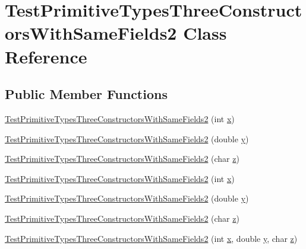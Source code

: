 \hypertarget{classTestPrimitiveTypesThreeConstructorsWithSameFields2}{
\section{TestPrimitiveTypesThreeConstructorsWithSameFields2 Class Reference}
\label{classTestPrimitiveTypesThreeConstructorsWithSameFields2}
}
\subsection*{Public Member Functions}
\begin{DoxyCompactItemize}
\item 
\hyperlink{classTestPrimitiveTypesThreeConstructorsWithSameFields2_a21de4d72a427b8ff8c87daaf504a3c83}{TestPrimitiveTypesThreeConstructorsWithSameFields2} (int \hyperlink{classTestPrimitiveTypesThreeConstructorsWithSameFields2_a12541d3220601d6ee9aad996a9c0f80d}{x})
\item 
\hyperlink{classTestPrimitiveTypesThreeConstructorsWithSameFields2_a541ff10a2f77e0180abb933d0289ac44}{TestPrimitiveTypesThreeConstructorsWithSameFields2} (double \hyperlink{classTestPrimitiveTypesThreeConstructorsWithSameFields2_abdd1cc774447a96460c59d9a208e8b67}{y})
\item 
\hyperlink{classTestPrimitiveTypesThreeConstructorsWithSameFields2_a09e291c22e0e9e5d6fd5bd92dacfb1f7}{TestPrimitiveTypesThreeConstructorsWithSameFields2} (char \hyperlink{classTestPrimitiveTypesThreeConstructorsWithSameFields2_afb46476d95f1cb84e71b6d991e3c916a}{z})
\item 
\hyperlink{classTestPrimitiveTypesThreeConstructorsWithSameFields2_a21de4d72a427b8ff8c87daaf504a3c83}{TestPrimitiveTypesThreeConstructorsWithSameFields2} (int \hyperlink{classTestPrimitiveTypesThreeConstructorsWithSameFields2_a12541d3220601d6ee9aad996a9c0f80d}{x})
\item 
\hyperlink{classTestPrimitiveTypesThreeConstructorsWithSameFields2_a541ff10a2f77e0180abb933d0289ac44}{TestPrimitiveTypesThreeConstructorsWithSameFields2} (double \hyperlink{classTestPrimitiveTypesThreeConstructorsWithSameFields2_abdd1cc774447a96460c59d9a208e8b67}{y})
\item 
\hyperlink{classTestPrimitiveTypesThreeConstructorsWithSameFields2_a09e291c22e0e9e5d6fd5bd92dacfb1f7}{TestPrimitiveTypesThreeConstructorsWithSameFields2} (char \hyperlink{classTestPrimitiveTypesThreeConstructorsWithSameFields2_afb46476d95f1cb84e71b6d991e3c916a}{z})
\item 
\hyperlink{classTestPrimitiveTypesThreeConstructorsWithSameFields2_a61ea9c7e6708813c31b31e34d1e57ad2}{TestPrimitiveTypesThreeConstructorsWithSameFields2} (int \hyperlink{classTestPrimitiveTypesThreeConstructorsWithSameFields2_a12541d3220601d6ee9aad996a9c0f80d}{x}, double \hyperlink{classTestPrimitiveTypesThreeConstructorsWithSameFields2_abdd1cc774447a96460c59d9a208e8b67}{y}, char \hyperlink{classTestPrimitiveTypesThreeConstructorsWithSameFields2_afb46476d95f1cb84e71b6d991e3c916a}{z})
\end{DoxyCompactItemize}
